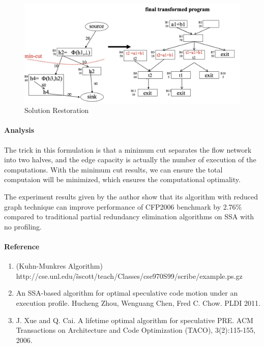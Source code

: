 \begin{exercise}[]
\begin{solution}
  \begin{figure}
    \centering
    \includegraphics[width=12cm]{img/ex6-restore.jpg}
    \caption{Solution Restoration}
    \label{restore}
  \end{figure}

  \paragraph{Analysis} The trick in this formulation is that a minimum cut separates the flow network into two halves, and the edge capacity is actually the number of execution of the computations. With the minimum cut results, we can ensure the total computaion will be minimized, which ensures the computational optimality.

  The experiment results given by the author show that its algorithm with reduced graph technique can improve performance of CFP2006 benchmark by 2.76\% compared to traditional partial redundancy elimination algorithms on SSA with no profiling.

\paragraph{Reference}
\begin{enumerate}
  \item (Kuhn-Munkres Algorithm) http://cse.unl.edu/\~sscott/teach/Classes/cse970S99/scribe/example.ps.gz
  \item An SSA-based algorithm for optimal speculative code motion under an execution profile. Hucheng Zhou, Wenguang Chen, Fred C. Chow. PLDI 2011.
  \item J. Xue and Q. Cai. A lifetime optimal algorithm for speculative PRE. ACM Transactions on Architecture and Code Optimization (TACO), 3(2):115-155, 2006.
\end{enumerate}

  \end{solution}
  \label{ex5}
\end{exercise}